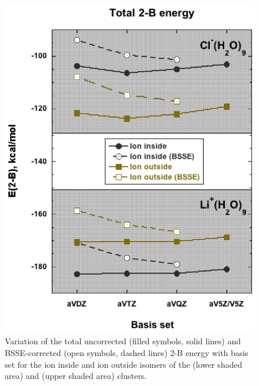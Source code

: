\begin{figure}[t]
\uwsinglespace
\centering
\includegraphics[width=.5\textwidth]{Figures/Chapter_3/figure_2.pdf}
\begin{spacing}{1.0}
\caption[Variation of the total uncorrected (filled symbols, solid lines) and BSSE-corrected (open symbols, dashed lines) 2-B energy with basis set for the ion inside and ion outside isomers of the  (lower shaded area) and  (upper shaded area) clusters.]{Variation of the total uncorrected (filled symbols, solid lines) and BSSE-corrected (open symbols, dashed lines) 2-B energy with basis set for the ion inside and ion outside isomers of the  (lower shaded area) and  (upper shaded area) clusters.}\label{fig:MBE_II_F2}
\end{spacing}
\end{figure}